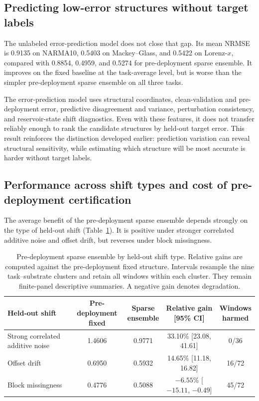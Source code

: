 \documentclass[preprint,12pt,authoryear]{elsarticle}
\begin{document}
\subsection{Predicting low-error structures without target labels}

The unlabeled error-prediction model does not close that gap. Its mean NRMSE is 0.9135 on NARMA10, 0.5403 on Mackey--Glass, and 0.5422 on Lorenz-$x$, compared with 0.8854, 0.4959, and 0.5274 for pre-deployment sparse ensemble. It improves on the fixed baseline at the task-average level, but is worse than the simpler pre-deployment sparse ensemble on all three tasks.

The error-prediction model uses structural coordinates, clean-validation and pre-deployment error, predictive disagreement and variance, perturbation consistency, and reservoir-state shift diagnostics. Even with these features, it does not transfer reliably enough to rank the candidate structures by held-out target error. This result reinforces the distinction developed earlier: prediction variation can reveal structural sensitivity, while estimating which structure will be most accurate is harder without target labels.

\subsection{Performance across shift types and cost of pre-deployment certification}

The average benefit of the pre-deployment sparse ensemble depends strongly on the type of held-out shift (Table~\ref{tab:shift_family_results}). It is positive under stronger correlated additive noise and offset drift, but reverses under block missingness.

\begin{table}[H]
\centering
\caption{Pre-deployment sparse ensemble by held-out shift type. Relative gains are computed against the pre-deployment fixed structure. Intervals resample the nine task--substrate clusters and retain all windows within each cluster. They remain finite-panel descriptive summaries. A negative gain denotes degradation.}
\label{tab:shift_family_results}
\scriptsize
\setlength{\tabcolsep}{4pt}
\begin{tabular}{>{\raggedright\arraybackslash}p{}cccc}
\toprule
Held-out shift & \shortstack{Pre-deployment\\fixed} & \shortstack{Sparse\\ensemble} & \shortstack{Relative gain\\{[95\% CI]}} & \shortstack{Windows\\harmed} \\
\midrule
Strong correlated additive noise & 1.4606 & 0.9771 & 33.10\% [23.08, 41.61] & 0/36 \\
Offset drift & 0.6950 & 0.5932 & 14.65\% [11.18, 16.82] & 16/72 \\
Block missingness & 0.4776 & 0.5088 & $-6.55\%$ [$-15.11$, $-0.49$] & 45/72 \\
\bottomrule
\end{tabular}
\end{table}
\end{document}
